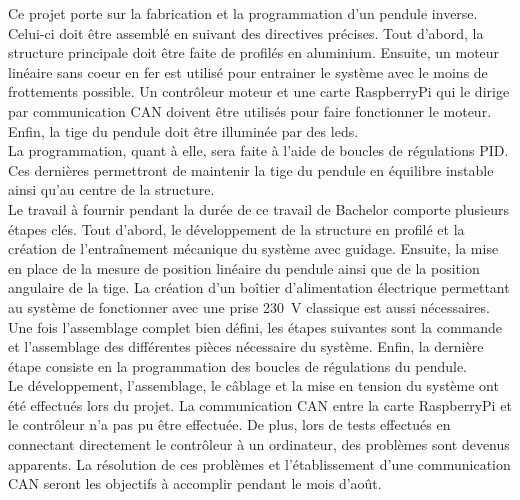 Ce projet porte sur la fabrication et la programmation d'un pendule inverse. Celui-ci doit être assemblé en suivant des directives précises.
Tout d'abord, la structure principale doit être faite de profilés en aluminium. Ensuite, un moteur linéaire sans coeur en fer est utilisé pour
entrainer le système avec le moins de frottements possible. Un contrôleur moteur et une carte RaspberryPi qui le dirige par communication \gls{CAN}
doivent être utilisés pour faire fonctionner le moteur. Enfin, la tige du pendule doit être illuminée par des leds.\\

La programmation, quant à elle, sera faite à l'aide de boucles de régulations \gls{PID}. Ces dernières permettront de maintenir la tige du pendule
en équilibre instable ainsi qu'au centre de la structure.\\

Le travail à fournir pendant la durée de ce travail de Bachelor comporte plusieurs étapes clés. Tout d'abord, le développement de la structure
en profilé et la création de l'entraînement mécanique du système avec guidage. Ensuite, la mise en place de la mesure de position linéaire
du pendule ainsi que de la position angulaire de la tige. La création d'un boîtier d'alimentation électrique permettant au système de
fonctionner avec une prise 230~V classique est aussi nécessaires. Une fois l'assemblage complet bien défini, les étapes suivantes sont la commande
et l'assemblage des différentes pièces nécessaire du système. Enfin, la dernière étape consiste en la programmation des boucles de régulations du
pendule.\\

Le développement, l'assemblage, le câblage et la mise en tension du système ont été effectués lors du projet. La communication CAN entre la carte
RaspberryPi et le contrôleur n'a pas pu être effectuée. De plus, lors de tests effectués en connectant directement le contrôleur à un ordinateur,
des problèmes sont devenus apparents. La résolution de ces problèmes et l'établissement d'une communication \gls{CAN} seront les objectifs à
accomplir pendant le mois d'août.